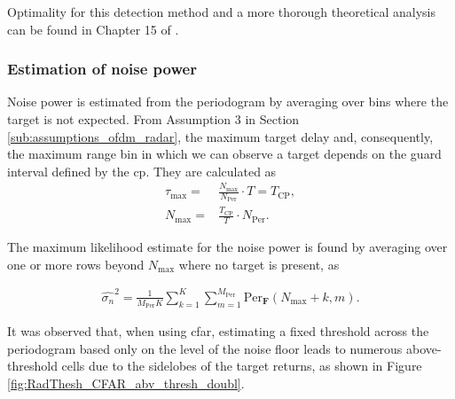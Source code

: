 				Optimality for this detection method and a more thorough theoretical analysis can be found in Chapter 15 of \cite{Richards_Scheer_Holm_2010}.

				\subsubsection{Estimation of noise power}
	
					Noise power is estimated from the periodogram by averaging over bins where the target is not expected.
					From Assumption 3 in Section \ref{sub:assumptions_ofdm_radar}, the maximum target delay and, consequently, the maximum range bin in which we can observe a target depends on the guard interval defined by the \gls{cp}. They are calculated as 
					\begin{align}
						\tau_{\text{max}} =& \frac{N_{\text{max}}}{N_{\text{Per}}}\cdot T = T_\text{CP} ,\\
						N_{\text{max}} =& \frac{T_\text{CP}}{T}\cdot N_{\text{Per}}.
					\end{align} 
					
					The maximum likelihood estimate for the noise power is found by averaging over one or more rows beyond $N_{\text{max}}$ where no target is present, as
			
					\begin{align}
					\label{align: threshold_noise_power}
						\hat{\sigma_n}^2 = \frac{1}{M_{\text{Per}}K} \sum_{k=1}^K \sum_{m=1}^{M_{\text{Per}}} \text{Per}_{\bm{F}}(N_{\text{max}}+k, m).
					\end{align}
			
			It was observed that, when using \gls{cfar}, estimating a fixed threshold across the periodogram based only on the level of the noise floor leads to  numerous above-threshold cells due to the sidelobes of the target returns, as shown in Figure \ref{fig:RadThesh_CFAR_abv_thresh_doubl}.
			
